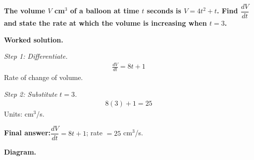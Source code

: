 \documentclass[11pt]{article}
\newcommand{\question}[1]{\par\medskip\noindent\textbf{#1}\par}
\begin{document}
\question{The volume \( V \) cm\( ^3 \) of a balloon at time \( t \) seconds is \( V = 4t^2 + t \). Find \( \dfrac{dV}{dt} \) and state the rate at which the volume is increasing when \( t = 3 \).}

\textbf{Worked solution.}

\textit{Step 1: Differentiate.}
\[\begin{gathered}
\frac{dV}{dt} = 8t + 1
\end{gathered}\]
Rate of change of volume.

\textit{Step 2: Substitute \( t = 3 \).}
\[\begin{gathered}
8(3) + 1 = 25
\end{gathered}\]
Units: cm\( ^3 \)/s.

\begin{answerbox}
\textbf{Final answer:}\quad \(\displaystyle  \dfrac{dV}{dt} = 8t + 1 \); rate \(\displaystyle  = 25 \) cm\(\displaystyle  ^3 \)/s.
\end{answerbox}
\textbf{Diagram.}
\end{document}
